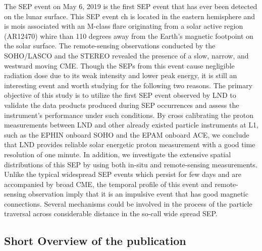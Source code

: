 The \ac{SEP} event on May 6, 2019 is the first \ac{SEP} event that has ever been detected on the lunar surface.
This \ac{SEP} event ch is located in the eastern hemisphere and is mois associated with an M-class flare originating from a solar active region (AR12470) whire than 110 degrees away from the Earth's magnetic footpoint on the solar surface. The remote-sensing observations conducted by the \ac{SOHO}/\ac{LASCO} and the \ac{STEREO} revealed the presence of a slow, narrow, and westward moving \ac{CME}. 
Though the \acp{SEP} from this event cause negligible radiation dose due to its weak intensity and lower peak energy, it is still an interesting event and worth studying for the following two reasons.
The primary objective of this study is to utilize the first \ac{SEP} event observed by \ac{LND} to validate the data products produced during \ac{SEP} occurrences and assess the instrument's performance under such conditions. By cross calibrating the proton measurements between \ac{LND} and other already existed particle instruments at \ac{L1}, such as the \ac{EPHIN} onboard \ac{SOHO} and the \ac{EPAM} onboard \ac{ACE}, we conclude that \ac{LND} provides reliable solar energetic proton measurement with a good time resolution of one minute.
In addition, we investigate the extensive spatial distributions of this \ac{SEP} by using both in-situ and remote-sensing measurements. Unlike the typical widespread \ac{SEP} events which persist for few days and are accompanied by broad \ac{CME}, the temporal profile of this event and remote-sensing observation imply that it is an impulsive event that has good magnetic connections. Several mechanisms could be involved in the process of the particle traversal across considerable distance in the so-call wide spread \acs{SEP}. 

\subsection*{Short Overview of the publication}

